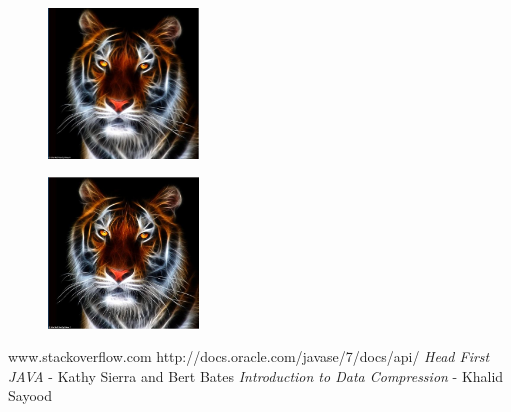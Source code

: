 \documentclass[twocolumn,12pt]{article}
\begin{document}
\begin{figure}[ht!]
\centering
\includegraphics[width=40mm]{tig7.jpg}
\end{figure}
\begin{figure}[ht!]
\centering
\includegraphics[width=40mm]{tig8.jpg}
\end{figure}

\vspace{30mm}
\begin{thebibliography}{9}
www.stackoverflow.com
http://docs.oracle.com/javase/7/docs/api/
\emph{Head First JAVA} - Kathy Sierra and Bert Bates
\emph{Introduction to Data Compression} - Khalid Sayood
\end{thebibliography}
\end{document}
